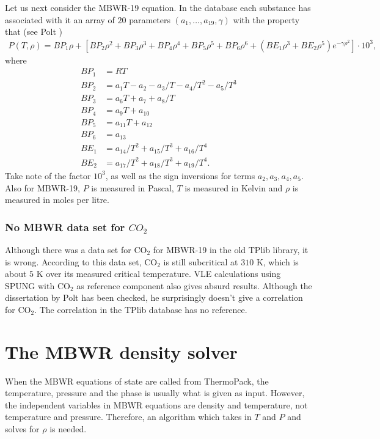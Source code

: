 \documentclass[english]{../thermomemo/thermomemo}
\numberwithin{equation}{section}
\begin{document}
Let us next consider the MBWR-19 equation. In the database each
substance has associated with it an array of $20$ parameters
$(a_1,\ldots,a_{19},\gamma)$ with the property that (see Polt \cite{Polt87})
\begin{align*}
  P(T,\rho) = BP_1 \rho + \left[ BP_2 \rho^2 + BP_3 \rho^3 + BP_4
    \rho^4 + BP_5 \rho^5 + BP_6 \rho^6 + (BE_1\rho^3 + BE_2 \rho^5)
    e^{-\gamma \rho^2} \right] \cdot 10^3,
\end{align*}
where
\begin{equation}
  \label{eq:BPBE_MBWR19}
  \begin{aligned}
    BP_1 &= RT \\
    BP_2 &= a_1T-a_2-a_3/T-a_4/T^2-a_5/T^3 \\
    BP_3 &= a_6T+a_7+a_8/T \\
    BP_4 &= a_9T+a_{10} \\
    BP_5 &= a_{11}T+a_{12} \\
    BP_6 &= a_{13} \\
    BE_1 &= a_{14}/T^2+a_{15}/T^3+a_{16}/T^4 \\
    BE_2 &= a_{17}/T^2+a_{18}/T^3+a_{19}/T^4.
  \end{aligned}
\end{equation}
Take note of the factor $10^3$, as well as the sign inversions for
terms $a_2,a_3,a_4,a_5$. Also for MBWR-19, $P$ is measured in Pascal, $T$ is
measured in Kelvin and $\rho$ is measured in moles per litre.

\subsubsection*{No MBWR data set for $CO_2$}
Although there was a data set for $\mathrm{CO}_2$ for MBWR-19 in the old TPlib
library, it is wrong. According to this data set, $\mathrm{CO_2}$ is still
subcritical at $310$ K, which is about $5$ K over its measured critical
temperature. VLE calculations using SPUNG with $\mathrm{CO}_2$ as reference
component also gives absurd results. Although the dissertation by Polt \cite{Polt87}
has been checked, he surprisingly doesn't give a correlation for
$\mathrm{CO}_2$. The correlation in the TPlib database has no reference.

\section{The MBWR density solver} \label{sec:density}
When the MBWR equations of state are called from ThermoPack, the
temperature, pressure and the phase is usually what
is given as input. However, the independent variables in MBWR
equations are density and temperature, not temperature and
pressure. Therefore, an algorithm which takes in $T$ and $P$ and
solves for $\rho$ is needed.
\end{document}
